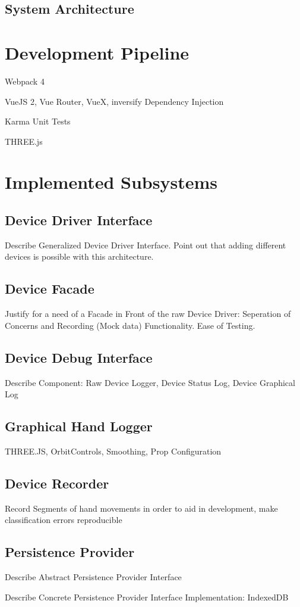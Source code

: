 \documentclass[master,english]{hgbthesis}
\begin{document}
\section{System Architecture}
\chapter{Development Pipeline}
Webpack 4

VueJS 2, Vue Router, VueX, inversify Dependency Injection

Karma Unit Tests

THREE.js
\chapter{Implemented Subsystems}
\section{Device Driver Interface}
Describe Generalized Device Driver Interface. Point out that adding different devices is possible with this architecture.
\section{Device Facade}
Justify for a need of a Facade in Front of the raw Device Driver: Seperation of Concerns and Recording (Mock data) Functionality. Ease of Testing.
\section{Device Debug Interface}
Describe Component: Raw Device Logger, Device Status Log, Device Graphical Log
\section{Graphical Hand Logger}
THREE.JS, OrbitControls, Smoothing, Prop Configuration
\section{Device Recorder}
Record Segments of hand movements in order to aid in development, make classification errors reproducible
\section{Persistence Provider}
Describe Abstract Persistence Provider Interface

Describe Concrete Persistence Provider Interface Implementation: IndexedDB
\end{document}
